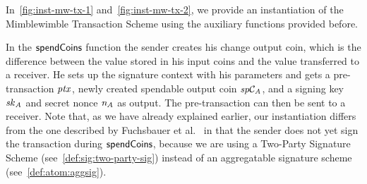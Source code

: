 \begin{center}
    \fbox{
    \begin{varwidth}{\textwidth}
        \procedure[linenumbering]{$\procCreateCoin{\varValue}{\varBlindingFactor}$} {
        \varCommitment \opFunResult \procCommit{\varValue}{\varBlindingFactor} \\
        \varProof \opFunResult \procProof{\varCoin}{\varValue}{\varBlindingFactor} \\
        \pcreturn (\varCommitment, \varBlindingFactor, \varValue, \varProof)
        }
        \procedure[linenumbering]{$\procCreatePreTx{\varMsg}{\funArray{\varCoinInp}}{\funArray{\varCoinOut}}{\funArray{\varProof}}{\varSigContext}{\funArray{\varCommitment}}{\varSignature}{\varTime}$}{
        \pcreturn ( \pcskipln \\
        \varMsg \opAssign \varMsg, \pcskipln \\
        \varInputs \opAssign \funArray{\varCoinInp}, \pcskipln \\
        \varOutputs \opAssign \funArray{\varCoinOut}, \pcskipln \\
        \varProofs \opAssign \funArray{\varProof}, \pcskipln \\
        \varSigContext \opAssign \varSigContext, \pcskipln \\
        \varCommits \opAssign \funArray{\varCommitment}, \pcskipln \\
        \varSignature \opAssign \varSignature, \pcskipln \\
        \varTime \opAssign \varTime
        )
        }
    \end{varwidth}
    }
\end{center}

In~\cref{fig:inst-mw-tx-1} and~\cref{fig:inst-mw-tx-2}, we provide an instantiation of the Mimblewimble Transaction Scheme using the auxiliary functions provided before.

In the $\mathsf{spendCoins}$ function the sender creates his change output coin, which is the difference between the value stored in his input coins and the value transferred to a receiver.
He sets up the signature context with his parameters and gets a pre-transaction $\mathit{ptx}$, newly created spendable output coin $\mathit{sp}\mathcal{C}_{\mathit{A}}$, and a signing key $\mathit{sk}_{\mathit{A}}$ and secret nonce $\mathit{\mathit{n}_{\mathit{A}}}$ as output.
The pre-transaction can then be sent to a receiver.
Note that, as we have already explained earlier, our instantiation differs from the one described by Fuchsbauer et al.~\cite{fuchsbauer2019aggregate} in that the sender does not yet sign the transaction during $\mathsf{spendCoins}$, because we are using a Two-Party Signature Scheme (see~\cref{def:sig:two-party-sig}) instead of an aggregatable signature scheme (see~\cref{def:atom:aggsig}).

